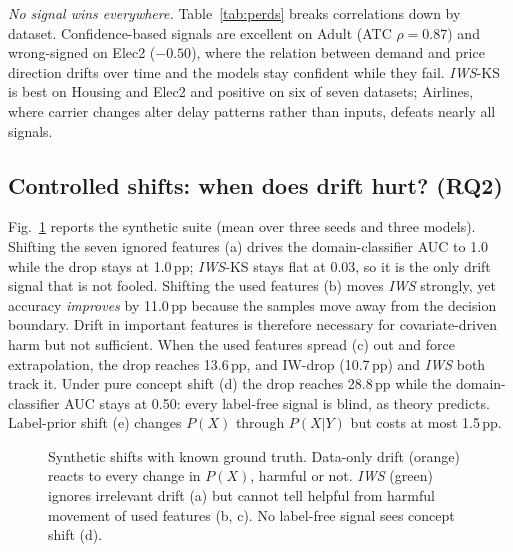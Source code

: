 \documentclass[conference]{IEEEtran}
\theoremstyle{plainhead}
\newcommand{\iws}{\textit{IWS}}
\newcommand{\pp}{\,pp\xspace}
\begin{document}
\textit{No signal wins everywhere.} Table~\ref{tab:perds} breaks correlations down by dataset. Confidence-based signals are excellent on Adult (ATC $\rho=0.87$) and wrong-signed on Elec2 ($-0.50$), where the relation between demand and price direction drifts over time and the models stay confident while they fail. \iws{}-KS is best on Housing and Elec2 and positive on six of seven datasets; Airlines, where carrier changes alter delay patterns rather than inputs, defeats nearly all signals.

\begin{table}[t]
\centering
\caption{Within-dataset Spearman $\rho$ with $\Delta$ (all models and seeds).}
\label{tab:perds}
\footnotesize

\end{table}

\subsection{Controlled shifts: when does drift hurt? (RQ2)}
\label{sec:synth}
Fig.~\ref{fig:synth} reports the synthetic suite (mean over three seeds and three models). Shifting the seven ignored features (a) drives the domain-classifier AUC to 1.0 while the drop stays at 1.0\pp; \iws{}-KS stays flat at 0.03, so it is the only drift signal that is not fooled. Shifting the used features (b) moves \iws{} strongly, yet accuracy \emph{improves} by 11.0\pp because the samples move away from the decision boundary. Drift in important features is therefore necessary for covariate-driven harm but not sufficient. When the used features spread (c) out and force extrapolation, the drop reaches 13.6\pp, and IW-drop (10.7\pp) and \iws{} both track it. Under pure concept shift (d) the drop reaches 28.8\pp while the domain-classifier AUC stays at 0.50: every label-free signal is blind, as theory predicts. Label-prior shift (e) changes $P(X)$ through $P(X|Y)$ but costs at most 1.5\pp.

\begin{figure}[t]
\centering

\caption{Synthetic shifts with known ground truth. Data-only drift (orange) reacts to every change in $P(X)$, harmful or not. \iws{} (green) ignores irrelevant drift (a) but cannot tell helpful from harmful movement of used features (b, c). No label-free signal sees concept shift (d).}
\label{fig:synth}
\end{figure}
\end{document}
